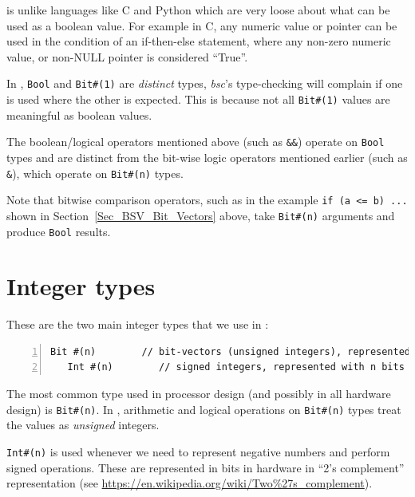 {\BSV} is unlike languages like C and Python which are very loose
about what can be used as a boolean value.  For example in C, any
numeric value or pointer can be used in the condition of an
if-then-else statement, where any non-zero numeric value, or non-NULL
pointer is considered ``True''.

In {\BSV}, \verb|Bool| and \verb|Bit#(1)| are \emph{distinct} types,
{\ie} \emph{bsc}'s type-checking will complain if one is used where
the other is expected.  This is because not all \verb|Bit#(1)| values
are meaningful as boolean values.

The boolean/logical operators mentioned above (such as \verb|&&|)
operate on \verb|Bool| types and are distinct from the bit-wise logic
operators mentioned earlier (such as \verb|&|), which operate on
\verb|Bit#(n)| types.

Note that bitwise comparison operators, such as in the example
\verb|if (a <= b) ...| shown in Section~\ref{Sec_BSV_Bit_Vectors}
above, take \verb|Bit#(n)| arguments and produce \verb|Bool| results.


\section{Integer types}

\label{BSV_ints}


These are the two main integer types that we use in {\BSV}:

{\footnotesize
\begin{Verbatim}[frame=single, numbers=left]
   Bit #(n)        // bit-vectors (unsigned integers), represented with n bits
   Int #(n)        // signed integers, represented with n bits
\end{Verbatim}
}

The most common type used in processor design (and possibly in all
hardware design) is \verb|Bit#(n)|. In {\BSV}, arithmetic and logical
operations on \verb|Bit#(n)| types treat the values as \emph{unsigned}
integers.

\verb|Int#(n)| is used whenever we need to represent negative numbers
and perform signed operations.  These are represented in bits in
hardware in ``2's complement'' representation (see
\url{https://en.wikipedia.org/wiki/Two%27s_complement}).

